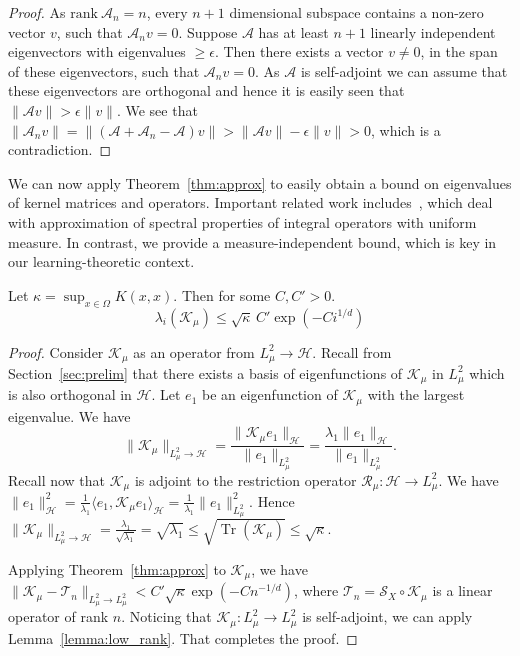 \documentclass[final,12pt]{colt2018}
\renewcommand{\H}{\mathcal{H}}
\newcommand{\K}{\mathcal{K_\mu}}
\newcommand{\I}{\mathcal{R_{\mu}}}
\newcommand{\A}{\mathcal{A}}
\newcommand{\T}{\mathcal{T}}
\newcommand{\LL}{{L^2_\mu}}
\renewcommand{\S}{{\mathcal S}}
\DeclareMathOperator{\Tr}{Tr}
\begin{document}
\begin{proof}
As $\mathrm{rank}~ \A_n=n$, every $n+1$ dimensional subspace contains a non-zero vector $v$, such that $\A_n v = 0$. Suppose $\A$ has at least $n+1$ linearly independent eigenvectors with eigenvalues $\ge \epsilon$. 
Then there exists a vector $v \ne 0$, in the span  of these eigenvectors, such that $\A_n v = 0$. As $\A$ is self-adjoint we can assume that these eigenvectors are orthogonal and hence it is easily seen that $\|\A v\| > \epsilon \|v\|$. We see that $\|\A_n v \| = \|(\A + \A_n - \A)v\| > \|\A v\| -\epsilon \|v\| >0$, which is a contradiction.
\end{proof}

We can now apply Theorem~\ref{thm:approx} to easily obtain a  bound on eigenvalues of kernel matrices and operators. Important related  work includes~\cite{schaback2002approximation,santin2016approximation}, which deal with approximation of spectral properties of integral operators with uniform measure.  
In contrast, we  provide a measure-independent bound, which is key in our learning-theoretic context. 

 
\begin{theorem}\label{th:eigendecay} Let $\kappa = \sup_{x \in \Omega} K(x,x)$. Then  for some $C,C'>0$. 
\begin{equation}\label{eq:eigendecay}
\lambda_i(\K) \le \sqrt{\kappa}\, C'  \exp(-C i^{1/d})
\end{equation}
\end{theorem} 
\begin{proof}
Consider $\K$ as an operator from $\LL \to \H$. Recall from Section~\ref{sec:prelim} that there exists a basis of eigenfunctions of $\K$  in $\LL$ which is also orthogonal in $\H$. Let $e_1$ be an  eigenfunction of $\K$ with the largest eigenvalue. We have
$$
\|\K\|_{\LL \to \H}= \frac{\|\K e_1\|_\H}{\|e_1\|_\LL} = \frac{\lambda_1  \|e_1\|_\H}{\|e_1\|_\LL}%
.$$  Recall now that $\K$ is adjoint to the restriction operator $\I: \H \to \LL$. We have $\|e_1\|_\H^2 = \frac{1}{\lambda_1}\langle e_1, \K e_1\rangle_\H = \frac{1}{\lambda_1} \| e_1\|^2_\LL.$ 
Hence 
 $
 \|\K\|_{\LL \to \H} = \frac{\lambda_1}{\sqrt{\lambda_1}}= \sqrt{\lambda_1} \le \sqrt{\Tr(\K)}\le \sqrt{\kappa}
 $.

Applying Theorem~\ref{thm:approx} to $\K$, we have $\|\K - \T_n\|_{\LL \to \LL} < C' \sqrt{\kappa} \exp(-C n^{-1/d})$, where $\T_n = \S_X \circ \K$ is a linear operator of rank $n$.  Noticing  that $\K:\LL \to \LL$ is  self-adjoint, we can apply Lemma~\ref{lemma:low_rank}. That completes the proof. 
\end{proof}
\end{document}
